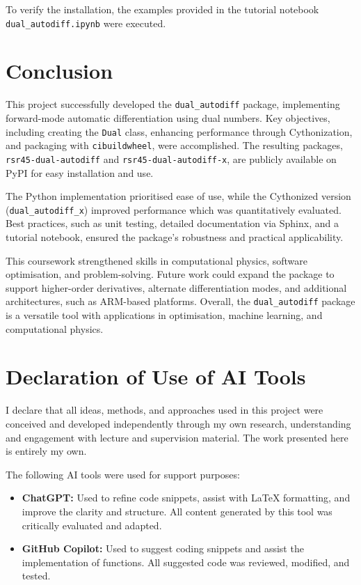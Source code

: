 \documentclass[a4paper,12pt]{article}
\begin{document}
To verify the installation, the examples provided in the tutorial notebook \texttt{dual\_autodiff.ipynb} were executed. 




\section{Conclusion}

This project successfully developed the \texttt{dual\_autodiff} package, implementing forward-mode automatic differentiation using dual numbers. Key objectives, including creating the \texttt{Dual} class, enhancing performance through Cythonization, and packaging with \texttt{cibuildwheel}, were accomplished. The resulting packages, \texttt{rsr45-dual-autodiff} and \texttt{rsr45-dual-autodiff-x}, are publicly available on PyPI for easy installation and use.

The Python implementation prioritised ease of use, while the Cythonized version (\texttt{dual\_autodiff\_x}) improved performance which was quantitatively evaluated. Best practices, such as unit testing, detailed documentation via Sphinx, and a tutorial notebook, ensured the package's robustness and practical applicability.

This coursework strengthened skills in computational physics, software optimisation, and problem-solving. Future work could expand the package to support higher-order derivatives, alternate differentiation modes, and additional architectures, such as ARM-based platforms. Overall, the \texttt{dual\_autodiff} package is a versatile tool with applications in optimisation, machine learning, and computational physics.

\printbibliography

\section*{Declaration of Use of AI Tools}

I declare that all ideas, methods, and approaches used in this project were conceived and developed independently through my own research, understanding and engagement with lecture and supervision material. The work presented here is entirely my own.

The following AI tools were used for support purposes:
\begin{itemize}
    \item \textbf{ChatGPT:} Used to refine code snippets, assist with LaTeX formatting, and improve the clarity and structure. All content generated by this tool was critically evaluated and adapted.
    \item \textbf{GitHub Copilot:} Used to suggest coding snippets and assist the implementation of functions. All suggested code was reviewed, modified, and tested.
\end{itemize}
\end{document}
